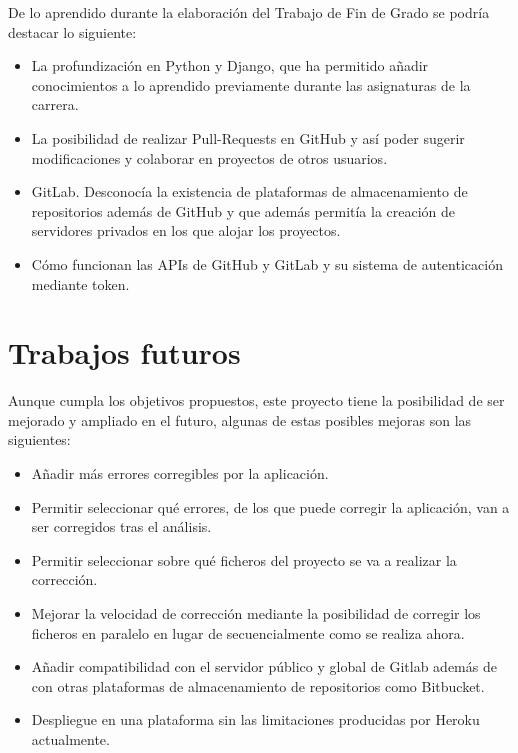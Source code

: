 \documentclass[a4paper, 12pt]{book}
\begin{document}
De lo aprendido durante la elaboración del Trabajo de Fin de Grado se podría destacar lo siguiente:

\begin{itemize}
  \item La profundización en Python y Django, que ha permitido añadir conocimientos a lo aprendido previamente durante las asignaturas de la carrera.
  \item La posibilidad de realizar Pull-Requests en GitHub y así poder sugerir modificaciones y colaborar en proyectos de otros usuarios.
  \item GitLab. Desconocía la existencia de plataformas de almacenamiento de repositorios además de GitHub y que además permitía la creación de servidores privados en los que alojar los proyectos.
  \item Cómo funcionan las APIs de GitHub y GitLab y su sistema de autenticación mediante token.
\end{itemize}

\section{Trabajos futuros}
\label{sec:trabajos_futuros}

Aunque cumpla los objetivos propuestos, este proyecto tiene la posibilidad de ser mejorado y ampliado en el futuro, algunas de estas posibles mejoras son las siguientes:

\begin{itemize}
  \item Añadir más errores corregibles por la aplicación. 
  \item Permitir seleccionar qué errores, de los que puede corregir la aplicación, van a ser corregidos tras el análisis.
  \item Permitir seleccionar sobre qué ficheros del proyecto se va a realizar la corrección.
  \item Mejorar la velocidad de corrección mediante la posibilidad de corregir los ficheros en paralelo en lugar de secuencialmente como se realiza ahora.
  \item Añadir compatibilidad con el servidor público y global de Gitlab además de con otras plataformas de almacenamiento de repositorios como Bitbucket.
  \item Despliegue en una plataforma sin las limitaciones producidas por Heroku actualmente.
\end{itemize}

\end{document}
